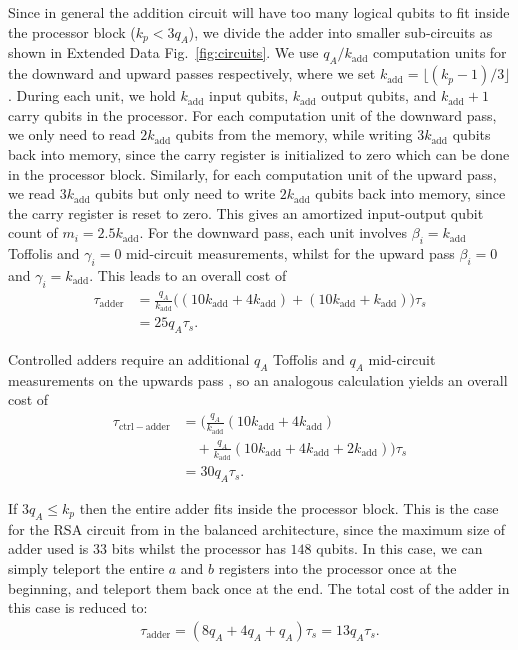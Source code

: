 \documentclass[reprint,twocolumn,secnumarabic,amssymb, aps, prx]{revtex4-2}
\newcommand{\kproc}{k_p}
\newcommand{\taus}{\tau_s}
\begin{document}
Since in general the addition circuit will have too many logical qubits to fit inside the processor block ($\kproc < 3q_A$), we divide the adder into smaller sub-circuits as shown in Extended Data Fig.~\ref{fig:circuits}. We use $q_A / k_{\mathrm{add}}$ computation units for the downward and upward passes respectively, where we set $k_{\mathrm{add}} = \lfloor (\kproc - 1) / 3 \rfloor$. During each unit, we hold $k_{\mathrm{add}}$ input qubits, $k_{\mathrm{add}}$ output qubits, and $k_{\mathrm{add}} + 1$ carry qubits in the processor. For each computation unit of the downward pass, we only need to read $2k_{\mathrm{add}}$ qubits from the memory, while writing $3k_{\mathrm{add}}$ qubits back into memory, since the carry register is initialized to zero which can be done in the processor block. Similarly, for each computation unit of the upward pass, we read $3k_{\mathrm{add}}$ qubits but only need to write $2k_{\mathrm{add}}$ qubits back into memory, since the carry register is reset to zero. This gives an amortized input-output qubit count of $m_i = 2.5 k_{\mathrm{add}}$. For the downward pass, each unit involves $\beta_i = k_{\mathrm{add}}$ Toffolis and $\gamma_i = 0$ mid-circuit measurements, whilst for the upward pass $\beta_i = 0$ and $\gamma_i = k_{\mathrm{add}}$. This leads to an overall cost of
\begin{align}
    \tau_{\mathrm{adder}} &= \frac{q_A}{k_{\mathrm{add}}}\Big( (10 k_{\mathrm{add}} + 4k_{\mathrm{add}})
     +(10 k_{\mathrm{add}} + k_{\mathrm{add}})\Big)\taus \nonumber\\
    &= 25 q_A \taus.
\end{align}

Controlled adders require an additional $q_A$ Toffolis and $q_A$ mid-circuit measurements on the upwards pass \cite{gidney2018halving}, so an analogous calculation yields an overall cost of
\begin{align}
    \tau_{\mathrm{ctrl-adder}} &= \Big(\frac{q_A}{k_{\mathrm{add}}} (10 k_{\mathrm{add}} + 4k_{\mathrm{add}}) \nonumber\\
    &\quad + \frac{q_A}{k_{\mathrm{add}}} (10 k_{\mathrm{add}} + 4k_{\mathrm{add}} + 2k_{\mathrm{add}})\Big)\taus \nonumber\\
    &= 30 q_A \taus.
\end{align}

If $3q_A \leq \kproc$ then the entire adder fits inside the processor block. This is the case for the RSA circuit from \cite{gidney2025how} in the balanced architecture, since the maximum size of adder used is $33$ bits whilst the processor has $148$ qubits. In this case, we can simply teleport the entire $a$ and $b$ registers into the processor once at the beginning, and teleport them back once at the end. The total cost of the adder in this case is reduced to:
\begin{align}
    \tau_{\mathrm{adder}} = (8 q_A + 4 q_A + q_A)\taus = 13 q_A \taus.
\end{align}
\end{document}
